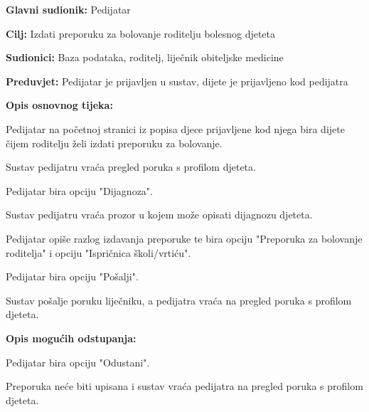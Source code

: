 					
					\noindent {}
					\begin{packed_item}
						
						\item \textbf{Glavni sudionik: }Pedijatar
						\item  \textbf{Cilj:} Izdati preporuku za bolovanje roditelju bolesnog djeteta
						\item  \textbf{Sudionici:} Baza podataka, roditelj, liječnik obiteljske medicine
						\item  \textbf{Preduvjet:} Pedijatar je prijavljen u sustav, dijete je prijavljeno kod pedijatra
						\item  \textbf{Opis osnovnog tijeka:}
						
						\item[] \begin{packed_enum}
							
							\item Pedijatar na početnoj stranici iz popisa djece prijavljene kod njega bira dijete čijem roditelju želi izdati preporuku za bolovanje.
							\item Sustav pedijatru vraća pregled poruka s profilom djeteta.
							\item Pedijatar bira opciju "Dijagnoza".
							\item Sustav pedijatru vraća prozor u kojem može opisati dijagnozu djeteta.
							\item Pedijatar opiše razlog izdavanja preporuke te bira opciju "Preporuka za bolovanje roditelja" i opciju "Ispričnica školi/vrtiću".
							\item Pedijatar bira opciju "Pošalji".
							\item Sustav pošalje poruku liječniku, a pedijatra vraća na pregled poruka s profilom djeteta.
						\end{packed_enum}
						
						\item  \textbf{Opis mogućih odstupanja:}
						
						\item[] \begin{packed_item}
							
							\item[6.a] Pedijatar bira opciju "Odustani".
							\item[] \begin{packed_enum}
								
								\item Preporuka neće biti upisana i sustav vraća pedijatra na pregled poruka s profilom djeteta.
							\end{packed_enum}
							
							
						\end{packed_item}
						
						
					\end{packed_item}
					
